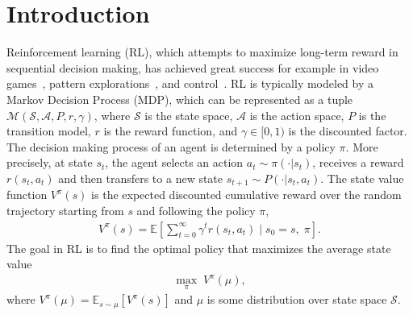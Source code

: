 \documentclass[10pt]{article}
\newcommand{\calA}{\mathcal{A}}
\newcommand{\calS}{\mathcal{S}}
\newcommand{\E}{\mathbb{E}}
\newcommand{\ls}{\left}
\newcommand{\rs}{\right}
\theoremstyle{plain}
\theoremstyle{definition}
\begin{document}
\section{Introduction}
\label{sec:introcution}
Reinforcement learning (RL), which attempts to maximize long-term reward in  sequential decision making, has achieved great success for example in video games~\cite{StarCraft}, pattern explorations~\cite{ref-AlphaFold,ref-AlphaTensor}, and control~\cite{robot2,robot3}.  RL is typically modeled by a Markov Decision Process (MDP), which can be represented as a tuple $\mathcal{M}(\calS, \calA, P, r, \gamma)$, where $\calS$ is the state space, $\calA$ is the action space, $P$ is the transition model, $r$ is the reward function, and $\gamma\in[0,1)$ is the discounted factor. The decision making process of an agent is determined by a policy $\pi$. More precisely, at state $s_t$, the agent selects an action $a_t \sim \pi(\cdot|s_t)$, receives a reward $r(s_t, a_t)$ and then transfers to a new state $s_{t+1} \sim P(\cdot|s_t, a_t)$. The state value function $V^\pi(s)$ is the expected discounted cumulative reward  over
the random trajectory starting from $s$ and following the policy $\pi$,
\begin{align*}
    V^{\pi}(s) = \E\ls[ \sum_{t=0}^\infty \gamma^t r(s_t, a_t) \; \Big| \; s_0 =s, \;\pi \rs].
\end{align*}
The  goal in RL is to find the optimal policy that maximizes the average state value
\begin{align}
    \max_{\pi} \; V^\pi(\mu),
    \label{eq:target-of-RL}
\end{align}
where $V^\pi(\mu) = \E_{s\sim \mu} [V^\pi(s)]$ and $\mu$ is some distribution over state space $\calS$.
\end{document}
